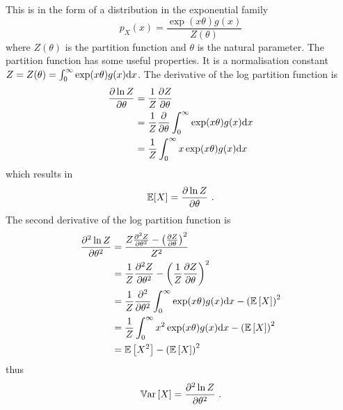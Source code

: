 This is in the form of a distribution in the exponential family
\begin{equation}
  p_X(x)=\dfrac{\exp\left(x\theta\right)g(x)}{Z(\theta)}
\end{equation}
where $Z(\theta)$ is the partition function and $\theta$ is the natural parameter. The partition function has some useful properties. It is a normalisation constant $Z=Z(\theta)=\int_{0}^{\infty}\exp(x\theta)g(x)\mathrm{d} x$. The derivative of the log partition function is
\begin{align*}
  \dfrac{\partial \ln Z}{\partial \theta} &= \dfrac{1}{Z}\dfrac{\partial Z}{\partial \theta}
  \\
  & = \dfrac{1}{Z}\dfrac{\partial}{\partial \theta} \int_0^\infty \exp(x\theta) g(x) \mathrm{d} x
  \\
  & = \dfrac{1}{Z}\int_0^\infty x \exp(x\theta) g(x) \mathrm{d} x
\end{align*}
which results in
\begin{equation}
\operatorname{\mathbb{E}}[X] = \dfrac{\partial \ln Z}{\partial \theta} \ .
\end{equation}
The second derivative of the log partition function is
\begin{align*}
  \dfrac{\partial^2\ln Z}{\partial \theta^2} &=
  \dfrac{
    Z\frac{\partial^2 Z}{\partial\theta^2}-\left(\frac{\partial Z}{\partial\theta}\right)^2
  }{
    Z^2
  }
  \\
  &=\dfrac{1}{Z}\dfrac{\partial^2 Z}{\partial \theta^2} - \left(\dfrac{1}{Z}\dfrac{\partial Z}{\partial \theta}\right)^2
  \\
  &=\dfrac{1}{Z}\dfrac{\partial^2}{\partial \theta^2}\int_0^\infty \exp(x\theta) g(x) \mathrm{d} x - \left(\operatorname{\mathbb{E}}\left[X\right]\right)^2
  \\
  &=\dfrac{1}{Z}\int_0^\infty x^2\exp(x\theta) g(x) \mathrm{d} x - \left(\operatorname{\mathbb{E}}\left[X\right]\right)^2
  \\
  &=\operatorname{\mathbb{E}}\left[X^2\right] - \left(\operatorname{\mathbb{E}}\left[X\right]\right)^2
\end{align*}
thus
\begin{equation}
\operatorname{\mathbb{V}ar}\left[X\right] = \dfrac{\partial^2\ln Z}{\partial \theta^2} \ .
\label{eq:appendix_variancePartitionFunction}
\end{equation}

